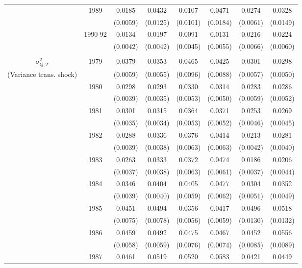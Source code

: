 \begin{table}
\begin{center}
{\begin{tabular}{cc|cc|cc|cc}
\\  & 1989 & 0.0185 &   0.0432 & 0.0107 &   0.0471 & 0.0274 &   0.0328 
\\  &                    & (0.0059) & (0.0125)  & (0.0101) & (0.0184)  & (0.0061) & (0.0149) 
\\  & 1990-92 & 0.0134 &   0.0197 & 0.0091 &   0.0131 & 0.0216 &   0.0224 
\\  &         & (0.0042) & (0.0042) & (0.0045) & (0.0055) & (0.0066) & (0.0060) 
\\ \hline  
\\ $\sigma^2_{Q,T}$ & 1979      & 0.0379 &   0.0353 & 0.0465 &   0.0425 & 0.0301 &   0.0298 
\\ (Variance trans. shock) &     & (0.0059) & (0.0055) & (0.0096) & (0.0088) & (0.0057) & (0.0050) 
\\  & 1980 & 0.0298 &   0.0293 & 0.0330 &   0.0314 & 0.0283 &   0.0286
\\  &                    & (0.0039) & (0.0035)  & (0.0053) & (0.0050)  & (0.0059) & (0.0052) 
\\  & 1981 & 0.0301 &   0.0315 & 0.0364 &   0.0371 & 0.0253 &   0.0269
\\  &                    & (0.0035) & (0.0034)  & (0.0053) & (0.0052)  & (0.0046) & (0.0045) 
\\  & 1982 & 0.0288 &   0.0336 & 0.0376 &   0.0414 & 0.0213 &   0.0281
\\  &                    & (0.0039) & (0.0038)  & (0.0063) & (0.0063)  & (0.0042) & (0.0040) 
\\  & 1983 & 0.0263 &   0.0333 & 0.0372 &   0.0474 & 0.0186 &   0.0206
\\  &                    & (0.0037) & (0.0038)  & (0.0063) & (0.0061)  & (0.0037) & (0.0044) 
\\  & 1984 & 0.0346 &   0.0404 & 0.0405 &   0.0477 & 0.0304 &   0.0352
\\  &                    & (0.0039) & (0.0040)  & (0.0059) & (0.0062)  & (0.0051) & (0.0049) 
\\  & 1985 & 0.0451 &   0.0494 & 0.0356 &   0.0417 & 0.0496 &   0.0518
\\  &                    & (0.0075) & (0.0078)  & (0.0056) & (0.0059)  & (0.0130) & (0.0132) 
\\  & 1986 & 0.0459 &   0.0492 & 0.0475 &   0.0467 & 0.0452 &   0.0556
\\  &                    & (0.0058) & (0.0059)  & (0.0076) & (0.0074)  & (0.0085) & (0.0089) 
\\  & 1987 & 0.0461 &   0.0519 & 0.0520 &   0.0583 & 0.0421 &   0.0449

\end{tabular}}
\end{center}
\end{table}
